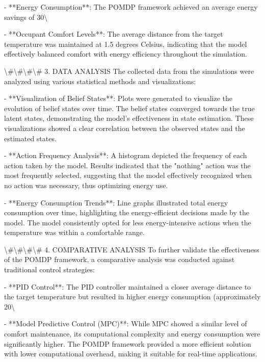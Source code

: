 \documentclass[11pt,a4paper]{article}
\begin{document}
- **Energy Consumption**: The POMDP framework achieved an average energy savings of 30\textbackslash{}%

- **Occupant Comfort Levels**: The average distance from the target temperature was maintained at 1.5 degrees Celsius, indicating that the model effectively balanced comfort with energy efficiency throughout the simulation.

\textbackslash{}#\textbackslash{}#\textbackslash{}#\textbackslash{}# 3. DATA ANALYSIS
The collected data from the simulations were analyzed using various statistical methods and visualizations:

- **Visualization of Belief States**: Plots were generated to visualize the evolution of belief states over time. The belief states converged towards the true latent states, demonstrating the model's effectiveness in state estimation. These visualizations showed a clear correlation between the observed states and the estimated states.

- **Action Frequency Analysis**: A histogram depicted the frequency of each action taken by the model. Results indicated that the "nothing" action was the most frequently selected, suggesting that the model effectively recognized when no action was necessary, thus optimizing energy use.

- **Energy Consumption Trends**: Line graphs illustrated total energy consumption over time, highlighting the energy-efficient decisions made by the model. The model consistently opted for less energy-intensive actions when the temperature was within a comfortable range.

\textbackslash{}#\textbackslash{}#\textbackslash{}#\textbackslash{}# 4. COMPARATIVE ANALYSIS
To further validate the effectiveness of the POMDP framework, a comparative analysis was conducted against traditional control strategies:

- **PID Control**: The PID controller maintained a closer average distance to the target temperature but resulted in higher energy consumption (approximately 20\textbackslash{}%

- **Model Predictive Control (MPC)**: While MPC showed a similar level of comfort maintenance, its computational complexity and energy consumption were significantly higher. The POMDP framework provided a more efficient solution with lower computational overhead, making it suitable for real-time applications.
\end{document}
